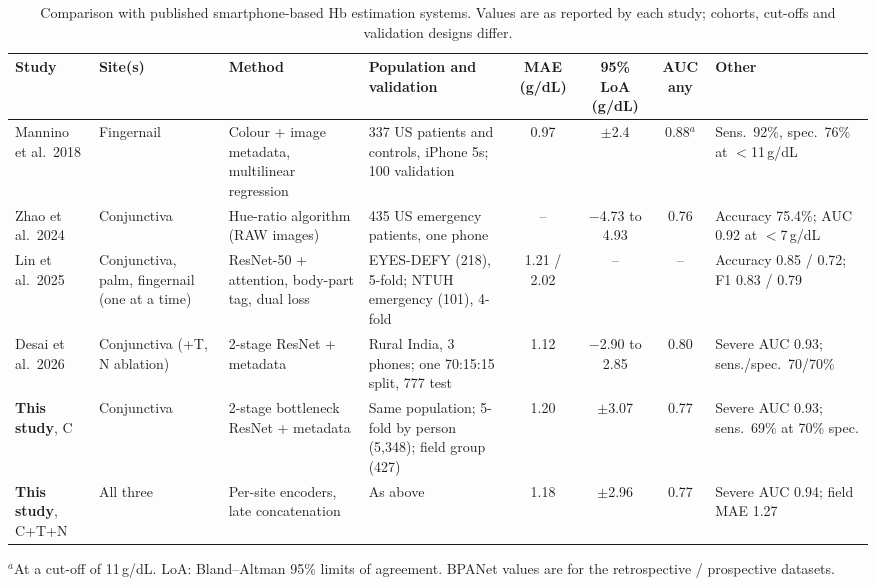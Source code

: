 \documentclass[10pt,a4paper,twocolumn]{article}
\newcommand{\gdl}{\,g/dL}
\begin{document}
\begin{table}[!t]
\centering\small
\caption{Comparison with published smartphone-based Hb estimation systems. Values are as reported by each study; cohorts, cut-offs and validation designs differ.}
\label{tab:literature}
\setlength{\tabcolsep}{4pt}
\renewcommand{\arraystretch}{1.15}
\begin{tabularx}{\textwidth}{@{}>{\raggedright\arraybackslash}p{2.3cm}>{\raggedright\arraybackslash}p{2.2cm}LLcccL@{}}
\toprule
Study & Site(s) & Method & Population and validation & MAE (g/dL) & 95\% LoA (g/dL) & AUC any & Other \\
\midrule
Mannino et al.\ 2018 \cite{mannino2018} & Fingernail & Colour + image metadata, multilinear regression & 337 US patients and controls, iPhone 5s; 100 validation & 0.97 & $\pm$2.4 & 0.88$^{a}$ & Sens.\ 92\%, spec.\ 76\% at $<$11\gdl \\
Zhao et al.\ 2024 \cite{zhao2024} & Conjunctiva & Hue-ratio algorithm (RAW images) & 435 US emergency patients, one phone & -- & $-$4.73 to 4.93 & 0.76 & Accuracy 75.4\%; AUC 0.92 at $<$7\gdl \\
Lin et al.\ 2025 \cite{lin2025} & Conjunctiva, palm, fingernail (one at a time) & ResNet-50 + attention, body-part tag, dual loss & EYES-DEFY (218), 5-fold; NTUH emergency (101), 4-fold & 1.21 / 2.02 & -- & -- & Accuracy 0.85 / 0.72; F1 0.83 / 0.79 \\
Desai et al.\ 2026 \cite{desai2026} & Conjunctiva (+T, N ablation) & 2-stage ResNet + metadata & Rural India, 3 phones; one 70:15:15 split, 777 test & 1.12 & $-$2.90 to 2.85 & 0.80 & Severe AUC 0.93; sens./spec.\ 70/70\% \\
\midrule
\textbf{This study}, C & Conjunctiva & 2-stage bottleneck ResNet + metadata & Same population; 5-fold by person (5,348); field group (427) & 1.20 & $\pm$3.07 & 0.77 & Severe AUC 0.93; sens.\ 69\% at 70\% spec. \\
\textbf{This study}, C+T+N & All three & Per-site encoders, late concatenation & As above & 1.18 & $\pm$2.96 & 0.77 & Severe AUC 0.94; field MAE 1.27 \\
\bottomrule
\end{tabularx}
\par\vspace{2pt}\raggedright\footnotesize $^{a}$At a cut-off of 11\gdl. LoA: Bland--Altman 95\% limits of agreement. BPANet values are for the retrospective / prospective datasets.
\end{table}
\end{document}
